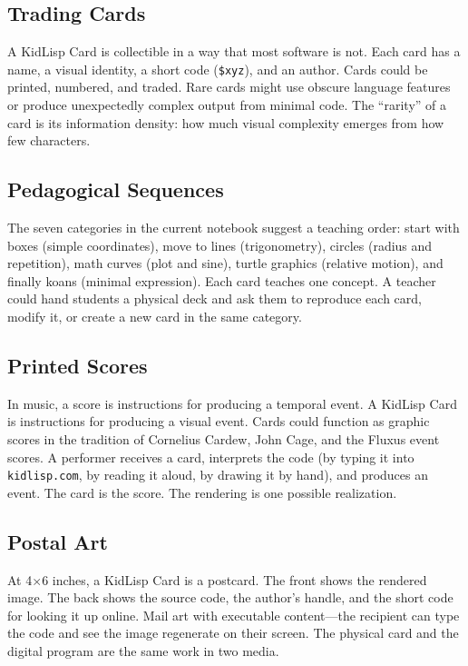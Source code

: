 \documentclass[10pt,letterpaper,twocolumn]{article}
\begin{document}
\subsection{Trading Cards}

A KidLisp Card is collectible in a way that most software is not. Each card has a name, a visual identity, a short code (\texttt{\$xyz}), and an author. Cards could be printed, numbered, and traded. Rare cards might use obscure language features or produce unexpectedly complex output from minimal code. The ``rarity'' of a card is its information density: how much visual complexity emerges from how few characters.

\subsection{Pedagogical Sequences}

The seven categories in the current notebook suggest a teaching order: start with boxes (simple coordinates), move to lines (trigonometry), circles (radius and repetition), math curves (plot and sine), turtle graphics (relative motion), and finally koans (minimal expression). Each card teaches one concept. A teacher could hand students a physical deck and ask them to reproduce each card, modify it, or create a new card in the same category.

\subsection{Printed Scores}

In music, a score is instructions for producing a temporal event. A KidLisp Card is instructions for producing a visual event. Cards could function as graphic scores in the tradition of Cornelius Cardew, John Cage, and the Fluxus event scores. A performer receives a card, interprets the code (by typing it into \texttt{kidlisp.com}, by reading it aloud, by drawing it by hand), and produces an event. The card is the score. The rendering is one possible realization.

\subsection{Postal Art}

At 4$\times$6 inches, a KidLisp Card is a postcard. The front shows the rendered image. The back shows the source code, the author's handle, and the short code for looking it up online. Mail art with executable content---the recipient can type the code and see the image regenerate on their screen. The physical card and the digital program are the same work in two media.
\end{document}
